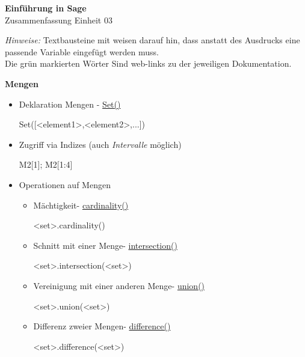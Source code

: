 \documentclass[a4paper,9pt,DIV15,twocolumn]{scrartcl}
\begin{document}
\begin{center}
    \textbf{\LARGE Einführung in Sage}\\
    {\large Zusammenfassung Einheit 03}
\end{center}
\textsl{Hinweise:} Textbausteine mit  weisen darauf hin, dass anstatt des Ausdrucks eine passende Variable eingefügt werden muss.\\
Die {\color{Green}grün} markierten Wörter Sind web-links zu der jeweiligen Dokumentation.
\medskip

\textbf{Mengen}

\begin{itemize}
 \item Deklaration Mengen - \href{https://sage.math.uni-goettingen.de/doc/static/reference/sage/sets/set.html#sage.sets.set.Set}{Set()} 
\begin{sagein}
Set([<element1>,<element2>,...])
\end{sagein}
 \item Zugriff via Indizes (auch \emph{Intervalle} möglich)
\begin{sagein}
M2[1]; M2[1:4]
\end{sagein}
 \item Operationen auf Mengen
\begin{itemize}

 \item Mächtigkeit- \href{https://sage.math.uni-goettingen.de/doc/static/reference/sage/sets/set.html#sage.sets.set.Set_object_difference.cardinality}{cardinality()}
\begin{sagein}
<set>.cardinality()
\end{sagein}

 \item Schnitt mit einer Menge- \href{https://sage.math.uni-goettingen.de/doc/static/reference/sage/sets/set.html#sage.sets.set.Set_object.intersection}{intersection()}
\begin{sagein}
<set>.intersection(<set>)
\end{sagein}

 \item Vereinigung mit einer anderen Menge- \href{https://sage.math.uni-goettingen.de/doc/static/reference/sage/sets/set.html#sage.sets.set.Set_object.union}{union()}
\begin{sagein}
<set>.union(<set>)
\end{sagein}

 \item Differenz zweier Mengen- \href{https://sage.math.uni-goettingen.de/doc/static/reference/sage/sets/set.html#sage.sets.set.Set_object.difference}{difference()}
\begin{sagein}
<set>.difference(<set>)
\end{sagein}


\end{itemize}
\end{itemize}
\end{document}
